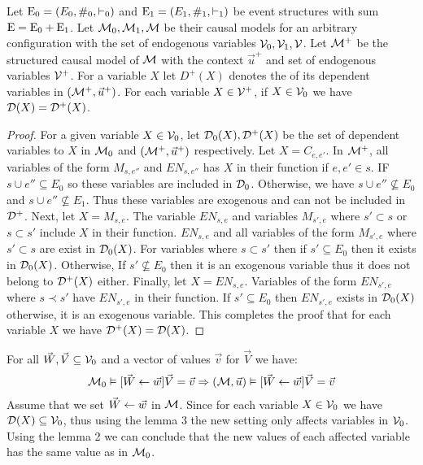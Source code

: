 \begin{lemma}
    Let $\mathrm{E}_0 = (E_0,\#_0,\vdash_0)$ and $\mathrm{E}_1 = (E_1,\#_1,\vdash_1)$
    be event structures with sum $\mathrm{E} = \mathrm{E}_0 + \mathrm{E}_1$.
    Let $\mathcal{M}_0,\mathcal{M}_1,\mathcal{M}$ be their causal models for an arbitrary
    configuration with the set of endogenous variables $\mathcal{V}_0,\mathcal{V}_1,\mathcal{V}$.
    Let $\mathcal{M}^+$ be the structured causal model of $\mathcal{M}$ with the context
    $\vec u^+$ and set of endogenous variables $\mathcal{V}^+$.
    For a variable $X$ let $D^+(X)$ denotes the of its dependent variables
    in $(\mathcal{M}^+,\vec u^+)$.
    For each variable $X \in \mathcal{V}^+$, if $X \in \mathcal{V}_0$
    we have $\mathcal{D}(X) = \mathcal{D}^+(X)$.
\end{lemma}
\begin{proof}
    For a given variable $X \in \mathcal{V}_0$, let $\mathcal{D}_0(X),\mathcal{D}^+(X)$
    be the set of dependent variables to $X$ in $\mathcal{M}_0$ and $(\mathcal{M}^+,\vec u^+)$
    respectively.
    Let $X = C_{e,e'}$.
    In $\mathcal{M}^+$, all variables of the form $M_{s,e''}$ and $EN_{s,e''}$ has
    $X$ in their function if $e,e' \in s$.
    IF $s \cup e'' \subseteq E_0$ so these variables are included in
    $\mathcal{D}_0$.
    Otherwise, we have $s\cup e'' \not \subseteq E_0$ and
    $s \cup e'' \not \subseteq E_1$.
    Thus these variables are exogenous and can not be included in $\mathcal{D}^+$.
    Next, let $X = M_{s,e}$.
    The variable $EN_{s,e}$ and variables $M_{s',e}$ where
    $s' \subset s$ or $s \subset s'$ include $X$ in their function.
    $EN_{s,e}$ and all variables of the form $M_{s',e}$ where
    $s' \subset s$ are exist in $\mathcal{D}_0(X)$.
    For variables where $s \subset s'$ then if $s' \subseteq E_0$ then
    it exists in $\mathcal{D}_0(X)$.
    Otherwise,
    If $s' \not \subseteq E_0$ then it is an exogenous variable thus it does
    not belong to $\mathcal{D}^+(X)$ either.
    Finally, let $X = EN_{s,e}$.
    Variables of the form $EN_{s',e}$ where $s \prec s'$ have $EN_{s',e}$
    in their function.
    If $s' \subseteq E_0$ then $EN_{s',e}$ exists in $\mathcal{D}_0(X)$
    otherwise, it is an exogenous variable.
    This completes the proof that for each variable $X$ we have
    $\mathcal{D}^+(X) = \mathcal{D}(X)$.
\end{proof}

\begin{lemma}
    For all $\vec W, \vec V \subseteq \mathcal{V}_0$ and a vector of values $\vec v$
    for $\vec V$ we have:
    \begin{align*}
        \mathcal{M}_0 \vDash [\vec W \leftarrow \vec w]\vec V = \vec v
        \Rightarrow (\mathcal{M},\vec u) \vDash [\vec W \leftarrow \vec w] \vec V = \vec v
    \end{align*}
    Assume that we set $\vec W \leftarrow \vec w$ in $\mathcal{M}$.
    Since for each variable $X \in \mathcal{V}_0$ we have
    $\mathcal{D}(X) \subseteq \mathcal{V}_0$, thus using the lemma 3 the new setting
    only affects variables in $\mathcal{V}_0$.
    Using the lemma 2 we can conclude that the new values of each affected
    variable has the same value as in $\mathcal{M}_0$.
\end{lemma}

